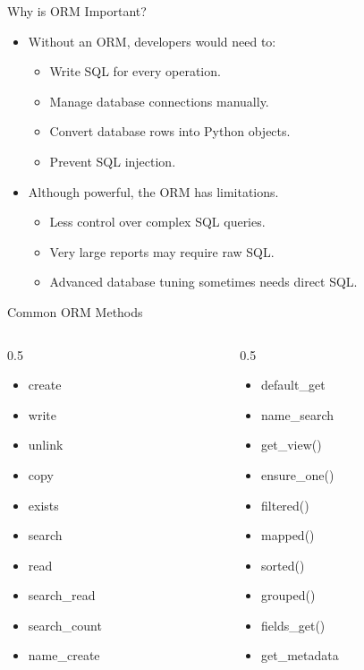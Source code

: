 \begin{frame}{Why is ORM Important?}
	\begin{itemize}
		\item Without an ORM, developers would need to:
		\begin{itemize}
			\item Write SQL for every operation.
			\item Manage database connections manually.
			\item Convert database rows into Python objects.
			\item Prevent SQL injection.
		\end{itemize}
		\item Although powerful, the ORM has limitations.
		\begin{itemize}
			\item Less control over complex SQL queries.
			\item Very large reports may require raw SQL.
			\item Advanced database tuning sometimes needs direct SQL.
		\end{itemize}
	\end{itemize}
\end{frame}

\begin{frame}{Common ORM Methods}
	\begin{columns}
		\begin{column}{0.5\textwidth}
			\begin{itemize}
				\item create
				\item write
				\item unlink
				\item copy
				\item exists
				\item search
				\item read
				\item search\_read
				\item search\_count
				\item name\_create
			\end{itemize}
		\end{column}
		\begin{column}{0.5\textwidth}
			\begin{itemize}
				\item default\_get
				\item name\_search
				\item get\_view()
				\item ensure\_one()
				\item filtered()
				\item mapped()
				\item sorted()
				\item grouped()
				\item fields\_get()
				\item get\_metadata
			\end{itemize}
		\end{column}
	\end{columns}
\end{frame}
